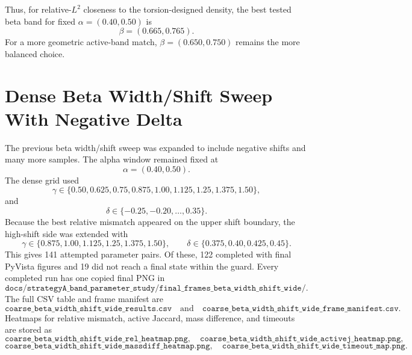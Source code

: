 \documentclass[11pt]{article}
\begin{document}
Thus, for relative-\(L^2\) closeness to the torsion-designed density, the best
tested beta band for fixed \(\alpha=(0.40,0.50)\) is
\[
\beta=(0.665,0.765).
\]
For a more geometric active-band match, \(\beta=(0.650,0.750)\) remains the
more balanced choice.

\section{Dense Beta Width/Shift Sweep With Negative Delta}

The previous beta width/shift sweep was expanded to include negative shifts and
many more samples.  The alpha window remained fixed at
\[
\alpha=(0.40,0.50).
\]
The dense grid used
\[
\gamma\in\{0.50,0.625,0.75,0.875,1.00,1.125,1.25,1.375,1.50\},
\]
and
\[
\delta\in\{-0.25,-0.20,\ldots,0.35\}.
\]
Because the best relative mismatch appeared on the upper shift boundary, the
high-shift side was extended with
\[
\gamma\in\{0.875,1.00,1.125,1.25,1.375,1.50\},\qquad
\delta\in\{0.375,0.40,0.425,0.45\}.
\]
This gives 141 attempted parameter pairs.  Of these, 122 completed with final
PyVista figures and 19 did not reach a final state within the guard.  Every
completed run has one copied final PNG in
\[
\texttt{docs/strategyA\_band\_parameter\_study/final\_frames\_beta\_width\_shift\_wide/}.
\]
The full CSV table and frame manifest are
\[
\texttt{coarse\_beta\_width\_shift\_wide\_results.csv}
\quad\text{and}\quad
\texttt{coarse\_beta\_width\_shift\_wide\_frame\_manifest.csv}.
\]
Heatmaps for relative mismatch, active Jaccard, mass difference, and timeouts
are stored as
\[
\texttt{coarse\_beta\_width\_shift\_wide\_rel\_heatmap.png},
\quad
\texttt{coarse\_beta\_width\_shift\_wide\_activej\_heatmap.png},
\]
\[
\texttt{coarse\_beta\_width\_shift\_wide\_massdiff\_heatmap.png},
\quad
\texttt{coarse\_beta\_width\_shift\_wide\_timeout\_map.png}.
\]
\end{document}

